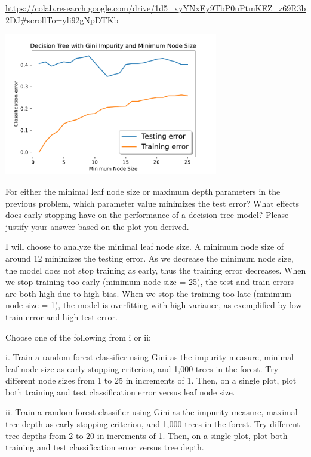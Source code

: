 \begin{solution}
    \url{https://colab.research.google.com/drive/1d5_xyYNxEy9TbP0uPtmKEZ_z69R3b2DJ#scrollTo=yli92gNpDTKb}
    \begin{center}
        \includegraphics[width=0.7\textwidth]{fig1.pdf}
    \end{center}
\end{solution}

\problem[6]
For either the minimal leaf node size or maximum depth parameters in the previous problem, which parameter value minimizes the test error? What effects does early stopping have on the performance of a decision tree model?
Please justify your answer based on the plot you derived.

\begin{solution}
    I will choose to analyze the minimal leaf node size. A minimum node size of around 12 minimizes the testing error. As we decrease the minimum node size, the model does not stop training as early, thus the training error decreases. When we stop training too early (minimum node size = 25), the test and train errors are both high due to high bias. When we stop the training too late (minimum node size = 1), the model is overfitting with high variance, as exemplified by low train error and high test error.
\end{solution}

\indent\problem[4] Choose one of the following from i or ii: \smallskip 

\noindent i. Train a random forest classifier using Gini as the impurity measure, minimal leaf node size as early stopping criterion, and 1,000 trees in the forest. Try different node sizes from 1 to 25 in increments of 1. Then, on a single plot, plot both training and test classification error versus
leaf node size.

ii. Train a random forest classifier using Gini as the impurity measure, maximal tree depth as early stopping criterion, and 1,000 trees in the forest. Try different tree depths from 2 to 20 in increments of 1. Then, on a single plot, plot both training and test classification error versus tree depth.

